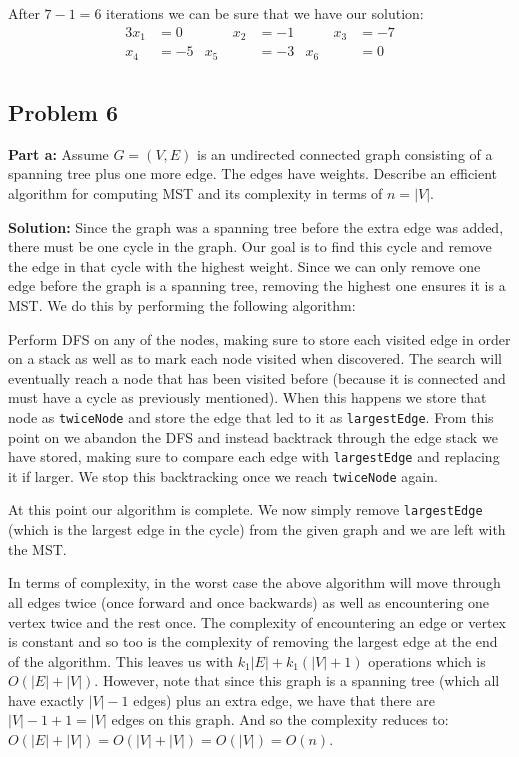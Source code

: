 \documentclass{article}
\newcommand{\code}[1]{\colorbox{light-gray}{\texttt{#1}}}
\begin{document}
After $7-1=6$ iterations we can be sure that we have our solution:
\begin{alignat*}{3}
  x_1  & = 0  &\qquad  x_2 &  = -1  &\qquad  x_3  & = -7\\
  x_4  & = -5  &  x_5 & = -3 &  x_6  & = 0\\
\end{alignat*}

\subsection*{Problem 6}
\noindent\textbf{Part a:} Assume $G = (V, E)$ is an undirected connected graph consisting of a spanning tree plus one more edge. The edges have weights. Describe an efficient algorithm for computing MST and its complexity in terms of $n=|V|$.
\bigskip

\noindent\textbf{Solution:} Since the graph was a spanning tree before the extra edge was added, there must be one cycle in the graph. Our goal is to find this cycle and remove the edge in that cycle with the highest weight. Since we can only remove one edge before the graph is a spanning tree, removing the highest one ensures it is a MST. We do this by performing the following algorithm:

Perform DFS on any of the nodes, making sure to store each visited edge in order on a stack as well as to mark each node visited when discovered. The search will eventually reach a node that has been visited before (because it is connected and must have a cycle as previously mentioned). When this happens we store that node as \code{twiceNode} and store the edge that led to it as \code{largestEdge}. From this point on we abandon the DFS and instead backtrack through the edge stack we have stored, making sure to compare each edge with \code{largestEdge} and replacing it if larger. We stop this backtracking once we reach \code{twiceNode} again.

At this point our algorithm is complete. We now simply remove \code{largestEdge} (which is the largest edge in the cycle) from the given graph and we are left with the MST.

In terms of complexity, in the worst case the above algorithm will move through all edges twice (once forward and once backwards) as well as encountering one vertex twice and the rest once. The complexity of encountering an edge or vertex is constant and so too is the complexity of removing the largest edge at the end of the algorithm. This leaves us with $k_1|E|+k_1(|V|+1)$ operations which is $O(|E|+|V|)$. However, note that since this graph is a spanning tree (which all have exactly $|V|-1$ edges) plus an extra edge, we have that there are $|V|-1+1=|V|$ edges on this graph. And so the complexity reduces to: $O(|E|+|V|)=O(|V|+|V|)=O(|V|)=O(n)$.
\bigskip
\end{document}
